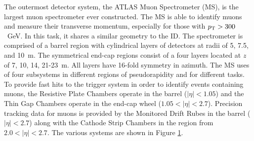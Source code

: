 \begin{figure}[h!]
\captionsetup[subfigure]{position=b}
\centering
{}
\caption{}
\label{fig:atlasMs}
\end{figure}

The outermost detector system, the ATLAS Muon Spectrometer (MS), is the largest muon spectrometer ever constructed. \check
The MS is able to identify muons and measure their transverse momentum, especially for those with $p_\text{T}>300$~GeV.
In this task, it shares a similar geometry to the ID.
The spectrometer is comprised of a barrel region with cylindrical layers of detectors at radii of 5, 7.5, and 10~m.
The symmetrical end-cap regions consist of a four layers located at $z$ of 7, 10, 14, 21-23~m. 
All layers have 16-fold symmetry in azimuth.
The MS uses of four subsystems in different regions of pseudorapidity and for different tasks. 
To provide fast hits to the trigger system in order to identify events containing muons, the Resistive Plate Chambers operate in the barrel ($|\eta|<1.05$) and the Thin Gap Chambers operate in the end-cap wheel ($1.05<|\eta|<2.7$).
Precision tracking data for muons is provided by the Monitored Drift Rubes in the barrel ($|\eta|<2.7$) along with the Cathode Strip Chambers in the region from $2.0<|\eta|<2.7$.
The various systems are shown in Figure \ref{fig:atlasMs}.
\cite{muonTdr}

